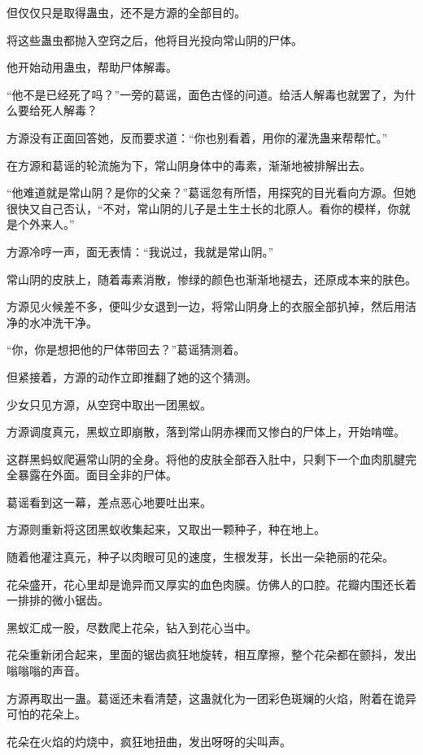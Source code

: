 
\begin{this_body}

但仅仅只是取得蛊虫，还不是方源的全部目的。

将这些蛊虫都抛入空窍之后，他将目光投向常山阴的尸体。

他开始动用蛊虫，帮助尸体解毒。

“他不是已经死了吗？”一旁的葛谣，面色古怪的问道。给活人解毒也就罢了，为什么要给死人解毒？

方源没有正面回答她，反而要求道：“你也别看着，用你的濯洗蛊来帮帮忙。”

在方源和葛谣的轮流施为下，常山阴身体中的毒素，渐渐地被排解出去。

“他难道就是常山阴？是你的父亲？”葛谣忽有所悟，用探究的目光看向方源。但她很快又自己否认，“不对，常山阴的儿子是土生土长的北原人。看你的模样，你就是个外来人。”

方源冷哼一声，面无表情：“我说过，我就是常山阴。”

常山阴的皮肤上，随着毒素消散，惨绿的颜色也渐渐地褪去，还原成本来的肤色。

方源见火候差不多，便叫少女退到一边，将常山阴身上的衣服全部扒掉，然后用洁净的水冲洗干净。

“你，你是想把他的尸体带回去？”葛谣猜测着。

但紧接着，方源的动作立即推翻了她的这个猜测。

少女只见方源，从空窍中取出一团黑蚁。

方源调度真元，黑蚁立即崩散，落到常山阴赤裸而又惨白的尸体上，开始啃噬。

这群黑蚂蚁爬遍常山阴的全身。将他的皮肤全部吞入肚中，只剩下一个血肉肌腱完全暴露在外面。面目全非的尸体。

葛谣看到这一幕，差点恶心地要吐出来。

方源则重新将这团黑蚁收集起来，又取出一颗种子，种在地上。

随着他灌注真元，种子以肉眼可见的速度，生根发芽，长出一朵艳丽的花朵。

花朵盛开，花心里却是诡异而又厚实的血色肉膜。仿佛人的口腔。花瓣内围还长着一排排的微小锯齿。

黑蚁汇成一股，尽数爬上花朵，钻入到花心当中。

花朵重新闭合起来，里面的锯齿疯狂地旋转，相互摩擦，整个花朵都在颤抖，发出嗡嗡嗡的声音。

方源再取出一蛊。葛谣还未看清楚，这蛊就化为一团彩色斑斓的火焰，附着在诡异可怕的花朵上。

花朵在火焰的灼烧中，疯狂地扭曲，发出呀呀的尖叫声。


\end{this_body}
